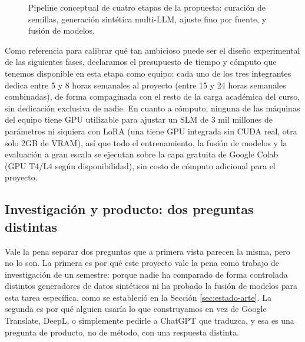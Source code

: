 \documentclass[11pt,a4paper]{article}
\begin{document}
\begin{figure}[h]
\centering
{}
\caption{Pipeline conceptual de cuatro etapas de la propuesta: curación de semillas, generación sintética multi-LLM, ajuste fino por fuente, y fusión de modelos.}
\label{fig:pipeline}
\end{figure}

Como referencia para calibrar qué tan ambicioso puede ser el diseño experimental de las siguientes fases, declaramos el presupuesto de tiempo y cómputo que tenemos disponible en esta etapa como equipo: cada uno de los tres integrantes dedica entre 5 y 8 horas semanales al proyecto (entre 15 y 24 horas semanales combinadas), de forma compaginada con el resto de la carga académica del curso, sin dedicación exclusiva de nadie. En cuanto a cómputo, ninguna de las máquinas del equipo tiene GPU utilizable para ajustar un SLM de 3 mil millones de parámetros ni siquiera con LoRA (una tiene GPU integrada sin CUDA real, otra solo 2GB de VRAM), así que todo el entrenamiento, la fusión de modelos y la evaluación a gran escala se ejecutan sobre la capa gratuita de Google Colab (GPU T4/L4 según disponibilidad), sin costo de cómputo adicional para el proyecto.

\subsection{Investigación y producto: dos preguntas distintas}

Vale la pena separar dos preguntas que a primera vista parecen la misma, pero no lo son. La primera es por qué este proyecto vale la pena como trabajo de investigación de un semestre: porque nadie ha comparado de forma controlada distintos generadores de datos sintéticos ni ha probado la fusión de modelos para esta tarea específica, como se estableció en la Sección \ref{sec:estado-arte}. La segunda es por qué alguien usaría lo que construyamos en vez de Google Translate, DeepL, o simplemente pedirle a ChatGPT que traduzca, y esa es una pregunta de producto, no de método, con una respuesta distinta.
\end{document}
